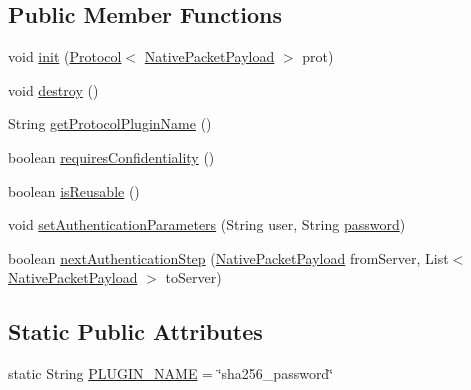 \subsection*{Public Member Functions}
\begin{DoxyCompactItemize}
\item 
void \mbox{\hyperlink{classcom_1_1mysql_1_1cj_1_1protocol_1_1a_1_1authentication_1_1_sha256_password_plugin_a027ed8d1567a19125c1af0233360ffc4}{init}} (\mbox{\hyperlink{interfacecom_1_1mysql_1_1cj_1_1protocol_1_1_protocol}{Protocol}}$<$ \mbox{\hyperlink{classcom_1_1mysql_1_1cj_1_1protocol_1_1a_1_1_native_packet_payload}{Native\+Packet\+Payload}} $>$ prot)
\item 
void \mbox{\hyperlink{classcom_1_1mysql_1_1cj_1_1protocol_1_1a_1_1authentication_1_1_sha256_password_plugin_a4755bae2cd1dda2546c6a338a192e7ca}{destroy}} ()
\item 
String \mbox{\hyperlink{classcom_1_1mysql_1_1cj_1_1protocol_1_1a_1_1authentication_1_1_sha256_password_plugin_a37166ed37c83a82c995bee4f1edb43eb}{get\+Protocol\+Plugin\+Name}} ()
\item 
boolean \mbox{\hyperlink{classcom_1_1mysql_1_1cj_1_1protocol_1_1a_1_1authentication_1_1_sha256_password_plugin_a13372ce1bdd725d30b81b938202e5cdc}{requires\+Confidentiality}} ()
\item 
boolean \mbox{\hyperlink{classcom_1_1mysql_1_1cj_1_1protocol_1_1a_1_1authentication_1_1_sha256_password_plugin_abaae26641bf351f5aafb4a6e49d178f0}{is\+Reusable}} ()
\item 
void \mbox{\hyperlink{classcom_1_1mysql_1_1cj_1_1protocol_1_1a_1_1authentication_1_1_sha256_password_plugin_a3094a9ba3e8a9543ec5e4d89bbb23d47}{set\+Authentication\+Parameters}} (String user, String \mbox{\hyperlink{classcom_1_1mysql_1_1cj_1_1protocol_1_1a_1_1authentication_1_1_sha256_password_plugin_acbf905ea39c085af53850aace57037c2}{password}})
\item 
boolean \mbox{\hyperlink{classcom_1_1mysql_1_1cj_1_1protocol_1_1a_1_1authentication_1_1_sha256_password_plugin_a388f69b4051f556e4b645c4dc85e375c}{next\+Authentication\+Step}} (\mbox{\hyperlink{classcom_1_1mysql_1_1cj_1_1protocol_1_1a_1_1_native_packet_payload}{Native\+Packet\+Payload}} from\+Server, List$<$ \mbox{\hyperlink{classcom_1_1mysql_1_1cj_1_1protocol_1_1a_1_1_native_packet_payload}{Native\+Packet\+Payload}} $>$ to\+Server)
\end{DoxyCompactItemize}
\subsection*{Static Public Attributes}
\begin{DoxyCompactItemize}
\item 
static String \mbox{\hyperlink{classcom_1_1mysql_1_1cj_1_1protocol_1_1a_1_1authentication_1_1_sha256_password_plugin_a8f15b1a2fa7390d4725037b171fd13a7}{P\+L\+U\+G\+I\+N\+\_\+\+N\+A\+ME}} = \char`\"{}sha256\+\_\+password\char`\"{}
\end{DoxyCompactItemize}
